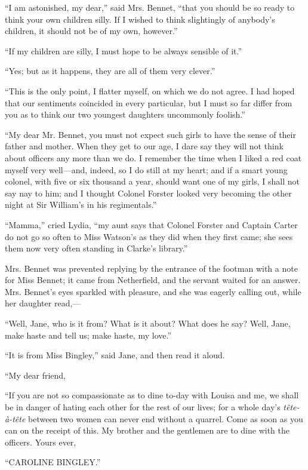 ``I am astonished, my dear,'' said Mrs. Bennet, ``that you should be so ready to think your own children silly. If I wished to think slightingly of anybody's children, it should not be of my own, however.''

``If my children are silly, I must hope to be always sensible of it.''

``Yes; but as it happens, they are all of them very clever.''

``This is the only point, I flatter myself, on which we do not agree. I had hoped that our sentiments coincided in every particular, but I must so far differ from you as to think our two youngest daughters uncommonly foolish.''

``My dear Mr. Bennet, you must not expect such girls to have the sense of their father and mother. When they get to our age, I dare say they will not think about officers any more than we do. I remember the time when I liked a red coat myself very well---and, indeed, so I do still at my heart; and if a smart young colonel, with five or six thousand a year, should want one of my girls, I shall not say nay to him; and I thought Colonel Forster looked very becoming the other night at Sir William's in his regimentals.''

``Mamma,'' cried Lydia, ``my aunt says that Colonel Forster and Captain Carter do not go so often to Miss Watson's as they did when they first came; she sees them now very often standing in Clarke's library.''

Mrs. Bennet was prevented replying by the entrance of the footman with a note for Miss Bennet; it came from Netherfield, and the servant waited for an answer. Mrs. Bennet's eyes sparkled with pleasure, and she was eagerly calling out, while her daughter read,---

``Well, Jane, who is it from? What is it about? What does he say? Well, Jane, make haste and tell us; make haste, my love.''

``It is from Miss Bingley,'' said Jane, and then read it aloud.

``My dear friend,

``If you are not so compassionate as to dine to-day with Louisa and me, we shall be in danger of hating each other for the rest of our lives; for a whole day's \textit{tête-à-tête} between two women can never end without a quarrel. Come as soon as you can on the receipt of this. My brother and the gentlemen are to dine with the officers. Yours ever,

``CAROLINE BINGLEY.''


